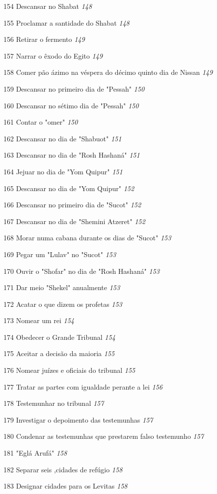154 Descansar no Shabat \emph{148}

155 Proclamar a santidade do Shabat \emph{148}

156 Retirar o fermento \emph{149}

157 Narrar o êxodo do Egito \emph{149}

158 Comer pão ázimo na véspera do décimo quinto dia de Nissan \emph{149}

159 Descansar no primeiro dia de "Pessah" \emph{150}

160 Descansar no sétimo dia de "Pessah" \emph{150}

161 Contar o "omer" \emph{150}

162 Descansar no dia de "Shabuot" \emph{151}

163 Descansar no dia de "Rosh Hashaná" \emph{151}

164 Jejuar no dia de "Yom Quipur" \emph{151}

165 Descansar no dia de "Yom Quipur" \emph{152}

166 Descansar no primeiro dia de "Sucot" \emph{152}

167 Descansar no dia de "Shemini Atzeret" \emph{152}

168 Morar numa cabana durante os dias de "Sucot" \emph{153}

169 Pegar um "Lulav" no "Sucot" \emph{153}

170 Ouvir o "Shofar" no dia de "Rosh Hashaná" \emph{153}

171 Dar meio "Shekel" anualmente \emph{153}

172 Acatar o que dizem os profetas \emph{153}

173 Nomear um rei \emph{154}

174 Obedecer o Grande Tribunal \emph{154}

175 Aceitar a decisão da maioria \emph{155}

176 Nomear juízes e oficiais do tribunal \emph{155}

177 Tratar as partes com igualdade perante a lei \emph{156}

178 Testemunhar no tribunal \emph{157}

179 Investigar o depoimento das testemunhas \emph{157}

180 Condenar as testemunhas que prestarem falso testemunho \emph{157}

181 "Eglá Arufá" \emph{158}

182 Separar seis ,cidades de refúgio \emph{158}

183 Designar cidades para os Levitas \emph{158}

